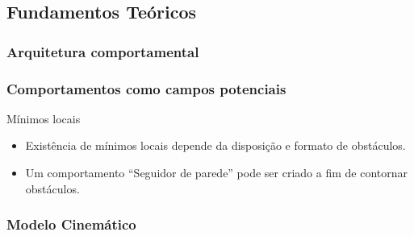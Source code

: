 \subsection{Fundamentos Teóricos}
\begin{frame}
	\frametitle{Arquitetura comportamental}
	
\end{frame}

\begin{frame}
	\frametitle{Comportamentos como campos potenciais}
	
\end{frame}

\begin{frame}
	\begin{block}{Mínimos locais}
		\begin{itemize}
		  \item Existência de mínimos locais depende da disposição e formato de
		  obstáculos.
		  \item Um comportamento ``Seguidor de parede'' pode ser criado a fim de
		  contornar obstáculos.
		\end{itemize}
	\end{block}
\end{frame}


\begin{frame}
	\frametitle{Modelo Cinemático}
	
\end{frame}


